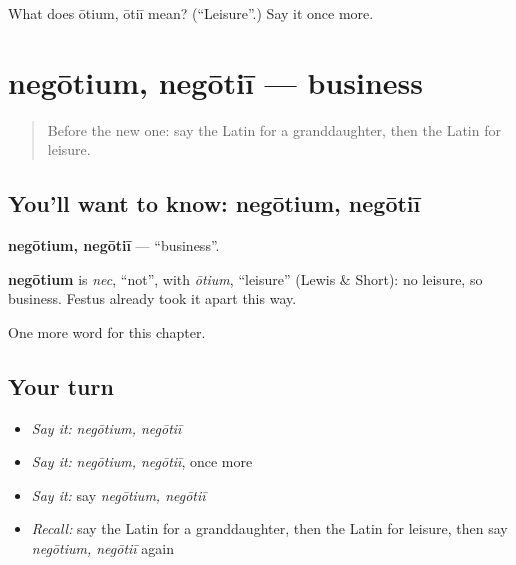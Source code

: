 \begin{tcolorbox}[breakable,colback=teal!4,colframe=teal!35!black,title={Before you move on}]
What does ōtium, ōtiī mean? (\textquotedblleft{}Leisure\textquotedblright{}.) Say it once more.
\end{tcolorbox}
\section[negōtium, negōtiī]{negōtium, negōtiī — business}

\label{lesson:LA-C274-negotium}



\begin{quote}
Before the new one: say the Latin for a granddaughter, then the Latin for leisure.
\end{quote}

\subsection*{You'll want to know: negōtium, negōtiī}
\textbf{negōtium, negōtiī} — \textquotedblleft{}business\textquotedblright{}.

\begin{cousinweb}
\textbf{negōtium} is \emph{nec}, \textquotedblleft{}not\textquotedblright{}, with \emph{ōtium}, \textquotedblleft{}leisure\textquotedblright{} (Lewis \& Short): no leisure, so business. Festus already took it apart this way.
\end{cousinweb}

\begin{grammarlens}[title={What you've built}]
One more word for this chapter.
\end{grammarlens}

\subsection*{Your turn}
\begin{itemize}
\raggedright
  \item \emph{Say it:} \emph{negōtium, negōtiī}
  \item \emph{Say it:} \emph{negōtium, negōtiī}, once more
  \item \emph{Say it:} say \emph{negōtium, negōtiī}
  \item \emph{Recall:} say the Latin for a granddaughter, then the Latin for leisure, then say \emph{negōtium, negōtiī} again
\end{itemize}

